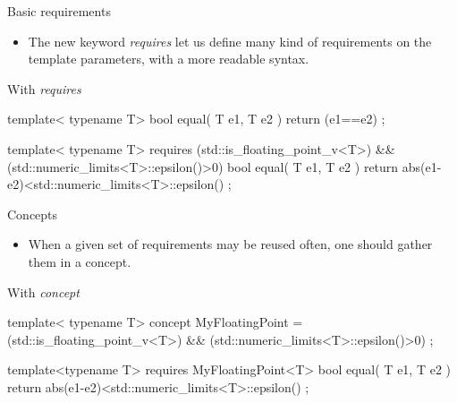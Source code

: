 \begin{frame}[fragile]
    \begin{block}{Basic requirements}
      \begin{itemize}
        \item The new keyword {\it requires} let us define many kind of requirements
      on the template parameters, with a more readable syntax.
      \end{itemize}
    \end{block}
    \begin{exampleblock}{With {\it requires}}
      \scriptsize
      \begin{cppcode*}{}
      template< typename T>
      bool equal( T e1, T e2 )
      { return (e1==e2) ; }

      template< typename T>
      requires
        (std::is_floating_point_v<T>) &&
        (std::numeric_limits<T>::epsilon()>0)
      bool equal( T e1, T e2 )
      { return abs(e1-e2)<std::numeric_limits<T>::epsilon() ; }
      \end{cppcode*}
    \end{exampleblock}
\end{frame}

\begin{frame}[fragile]
    \begin{block}{Concepts}
      \begin{itemize}
        \item When a given set of requirements may be reused often, one should gather them in a concept.
      \end{itemize}
    \end{block}
    \begin{exampleblock}{With {\it concept}}
      \scriptsize
      \begin{cppcode*}{}
      template< typename T>
      concept MyFloatingPoint =
        (std::is_floating_point_v<T>) &&
        (std::numeric_limits<T>::epsilon()>0) ;

      template<typename T>
      requires MyFloatingPoint<T>
      bool equal( T e1, T e2 )
      { return abs(e1-e2)<std::numeric_limits<T>::epsilon() ; }
      \end{cppcode*}
    \end{exampleblock}
\end{frame}

